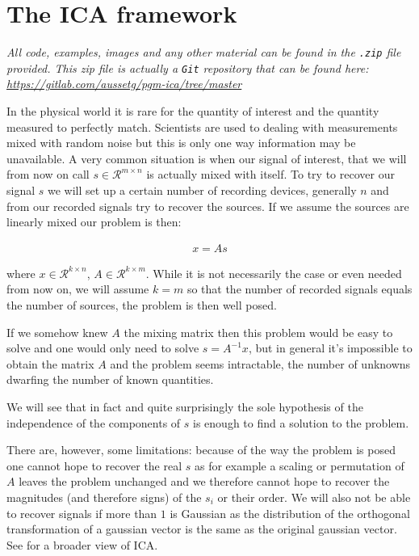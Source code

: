 \documentclass[a4paper,BCOR=5mm,oneside,openany]{scrreprt}
\begin{document}


\tableofcontents

\chapter{The ICA framework}

\emph{All code, examples, images and any other material can be found in the \texttt{.zip} file provided. This zip file is actually a \texttt{Git} repository that can be found here: \url{https://gitlab.com/aussetg/pgm-ica/tree/master}}

\vspace{1cm}

In the physical world it is rare for the quantity of interest and the quantity measured to perfectly match. Scientists are used to dealing with measurements mixed with random noise but this is only one way information may be unavailable.
A very common situation is when our signal of interest, that we will from now on call $s \in \mathcal{R}^{m \times n}$ is actually mixed with itself. To try to recover our signal $s$ we will set up a certain number of recording devices, generally $n$ and from our recorded signals try to recover the sources. If we assume the sources are linearly mixed our problem is then:

\begin{align*}
	x = A s
\end{align*}

where $x \in \mathcal{R}^{k \times n}$, $A \in \mathcal{R}^{k \times m}$. While it is not necessarily the case or even needed from now on, we will assume $k = m$ so that the number of recorded signals equals the number of sources, the problem is then well posed.

If we somehow knew $A$ the mixing matrix then this problem would be easy to solve and one would only need to solve $s = A^{-1} x$, but in general it's impossible to obtain the matrix $A$ and the problem seems intractable, the number of unknowns dwarfing the number of known quantities.

We will see that in fact and quite surprisingly the sole hypothesis of the independence of the components of $s$ is enough to find a solution to the problem. 

There are, however, some limitations: because of the way the problem is posed one cannot hope to recover the real $s$ as for example a scaling or permutation of $A$ leaves the problem unchanged and we therefore cannot hope to recover the magnitudes (and therefore signs) of the $s_i$ or their order. We will also not be able to recover signals if more than $1$ is Gaussian as the distribution of the orthogonal transformation of a gaussian vector is the same as the original gaussian vector. See \cite{Hyvarinen2001} for a broader view of ICA.
\end{document}
